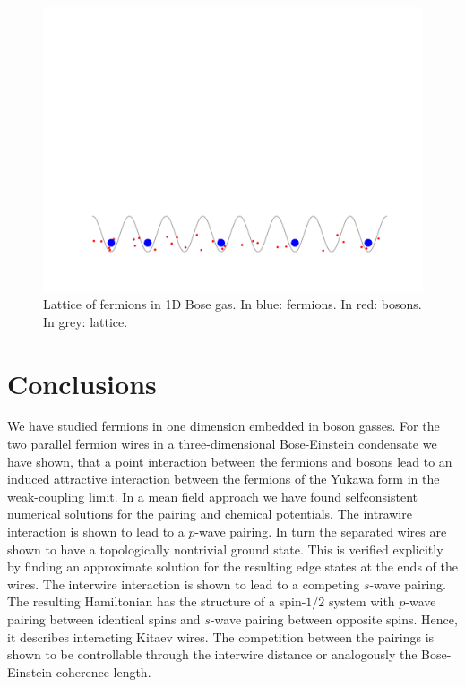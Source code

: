 \documentclass[11pt, twoside]{Thesis}
\begin{document}
\begin{figure}[H]
\center
\includegraphics[width=0.8\columnwidth]{gasandlattice2.pdf}
\\ Lattice of fermions in 1D Bose gas. In blue: fermions. In red: bosons. In grey: lattice.   
\end{figure}

\newpage



\part{Conclusions}
\chead{}
We have studied fermions in one dimension embedded in boson gasses. For the two parallel fermion wires in a three-dimensional Bose-Einstein condensate we have shown, that a point interaction between the fermions and bosons lead to an induced attractive interaction between the fermions of the Yukawa form in the weak-coupling limit. In a mean field approach we have found selfconsistent numerical solutions for the pairing and chemical potentials. The intrawire interaction is shown to lead to a $p$-wave pairing. In turn the separated wires are shown to have a topologically nontrivial ground state. This is verified explicitly by finding an approximate solution for the resulting edge states at the ends of the wires. The interwire interaction is shown to lead to a competing $s$-wave pairing. The resulting Hamiltonian has the structure of a spin-$1/2$ system with $p$-wave pairing between identical spins and $s$-wave pairing between opposite spins. Hence, it describes interacting Kitaev wires. The competition between the pairings is shown to be controllable through the interwire distance or analogously the Bose-Einstein coherence length. 
\end{document}
